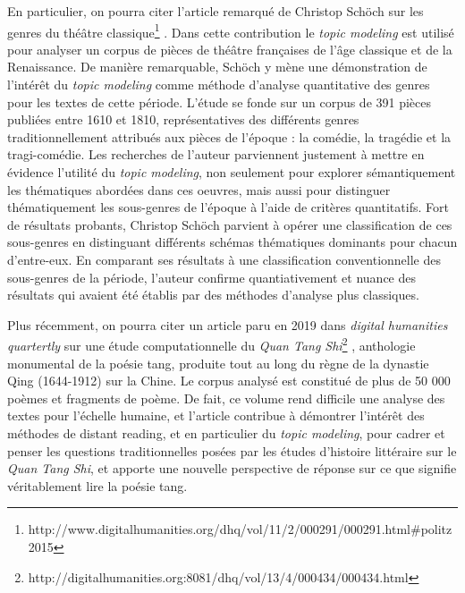 \documentclass[letterpaper,portrait,12pt]{article}
\begin{document}
	En particulier, on pourra citer l'article remarqu\'{e} de Christop Sch\"{o}ch sur les genres du th\'{e}\^{a}tre classique\footnote{	http://www.digitalhumanities.org/dhq/vol/11/2/000291/000291.html\#politz2015} . Dans cette contribution le \emph{topic modeling} est utilis\'{e} pour analyser un corpus de pi\`{e}ces de th\'{e}\^{a}tre fran\c{c}aises de l'\^{a}ge classique et de la Renaissance. De mani\`{e}re remarquable, Sch\"{o}ch y m\`{e}ne une d\'{e}monstration de l'int\'{e}r\^{e}t du \emph{topic modeling} comme m\'{e}thode d'analyse quantitative des genres pour les textes de cette p\'{e}riode. L'\'{e}tude se fonde sur un corpus de 391 pi\`{e}ces publi\'{e}es entre 1610 et 1810, repr\'{e}sentatives des diff\'{e}rents genres traditionnellement attribu\'{e}s aux pi\`{e}ces de l'\'{e}poque : la com\'{e}die, la trag\'{e}die et la tragi-com\'{e}die. Les recherches de l'auteur parviennent justement \`{a} mettre en \'{e}vidence l'utilit\'{e} du \emph{topic modeling}, non seulement pour explorer s\'{e}mantiquement les th\'{e}matiques abord\'{e}es dans ces oeuvres, mais aussi pour distinguer th\'{e}matiquement les sous-genres de l'\'{e}poque \`{a} l'aide de crit\`{e}res quantitatifs. Fort de r\'{e}sultats probants, Christop Sch\"{o}ch parvient \`{a} op\'{e}rer une classification de ces sous-genres en distinguant diff\'{e}rents sch\'{e}mas th\'{e}matiques dominants pour chacun d'entre-eux. En comparant ses r\'{e}sultats \`{a} une classification conventionnelle des sous-genres de la p\'{e}riode, l'auteur confirme quantiativement et nuance des r\'{e}sultats qui avaient \'{e}t\'{e} \'{e}tablis par des m\'{e}thodes d'analyse plus classiques. 





	Plus r\'{e}cemment, on pourra citer un article paru en 2019 dans \emph{digital humanities quartertly} sur une \'{e}tude computationnelle du \emph{Quan Tang Shi}\footnote{	http://digitalhumanities.org:8081/dhq/vol/13/4/000434/000434.html} , anthologie monumental de la po\'{e}sie tang, produite tout au long du r\`{e}gne de la dynastie Qing (1644-1912) sur la Chine. Le corpus analys\'{e} est constitu\'{e} de plus de 50 000 po\`{e}mes et fragments de po\`{e}me. De fait, ce volume rend difficile une analyse des textes pour l'\'{e}chelle humaine, et l'article contribue \`{a} d\'{e}montrer l'int\'{e}r\^{e}t des m\'{e}thodes de distant reading, et en particulier du \emph{topic modeling}, pour cadrer et penser les questions traditionnelles pos\'{e}es par les \'{e}tudes d'histoire litt\'{e}raire sur le \emph{Quan Tang Shi}, et apporte une nouvelle perspective de r\'{e}ponse sur ce que signifie v\'{e}ritablement lire la po\'{e}sie tang.
\end{document}
